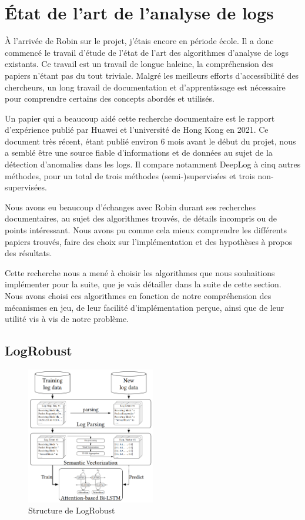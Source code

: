 \documentclass[openany, 11pt]{memoir}
\begin{document}
\section{État de l'art de l'analyse de logs}

À l'arrivée de Robin sur le projet, j'étais encore en période école. Il a donc commencé le travail d'étude de l'état de l'art des algorithmes d'analyse de \glspl{log} existants. Ce travail est un travail de longue haleine, la compréhension des papiers n'étant pas du tout triviale. Malgré les meilleurs efforts d'accessibilité des chercheurs, un long travail de documentation et d'apprentissage est nécessaire pour comprendre certains des concepts abordés et utilisés.

Un papier qui a beaucoup aidé cette recherche documentaire est le rapport d'expérience \cite{experiencereport} publié par Huawei et l'université de Hong Kong en 2021. Ce document très récent, étant publié environ 6 mois avant le début du projet, nous a semblé être une source fiable d'informations et de données au sujet de la détection d'anomalies dans les logs. Il compare notamment DeepLog à cinq autres méthodes, pour un total de trois méthodes (semi-)supervisées et trois non-supervisées.

Nous avons eu beaucoup d'échanges avec Robin durant ses recherches documentaires, au sujet des algorithmes trouvés, de détails incompris ou de points intéressant. Nous avons pu comme cela mieux comprendre les différents papiers trouvés, faire des choix sur l'implémentation et des hypothèses à propos des résultats.

\bigskip
Cette recherche nous a mené à choisir les algorithmes que nous souhaitions implémenter pour la suite, que je vais détailler dans la suite de cette section. Nous avons choisi ces algorithmes en fonction de notre compréhension des mécanismes en jeu, de leur facilité d'implémentation perçue, ainsi que de leur utilité vis à vis de notre problème.

\subsection{LogRobust}

\begin{figure}[ht]
	\centering
	\includegraphics[width=0.5\textwidth]{images/logrobust.png}
	\caption{Structure de LogRobust}
	\label{logrobust}
\end{figure}
\end{document}
